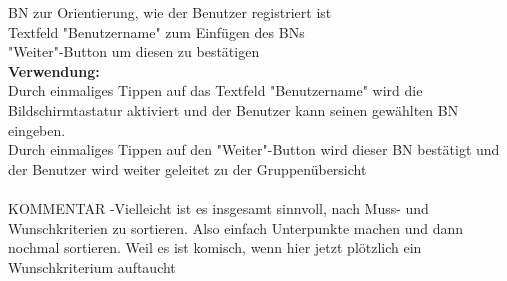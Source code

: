 BN zur Orientierung, wie der Benutzer registriert ist\\
Textfeld "Benutzername" zum Einfügen des BNs\\
"Weiter"-Button um diesen zu bestätigen\\
\textbf{Verwendung:}\\
Durch einmaliges Tippen auf das Textfeld "Benutzername" wird die Bildschirmtastatur aktiviert und der Benutzer kann seinen gewählten BN eingeben.\\
Durch einmaliges Tippen auf den "Weiter"-Button wird dieser BN bestätigt und der Benutzer wird weiter geleitet zu der Gruppenübersicht\\ \\

KOMMENTAR
-Vielleicht ist es insgesamt sinnvoll, nach Muss- und Wunschkriterien zu sortieren. Also einfach Unterpunkte machen und dann nochmal sortieren. Weil es ist komisch, wenn hier jetzt plötzlich ein Wunschkriterium auftaucht


